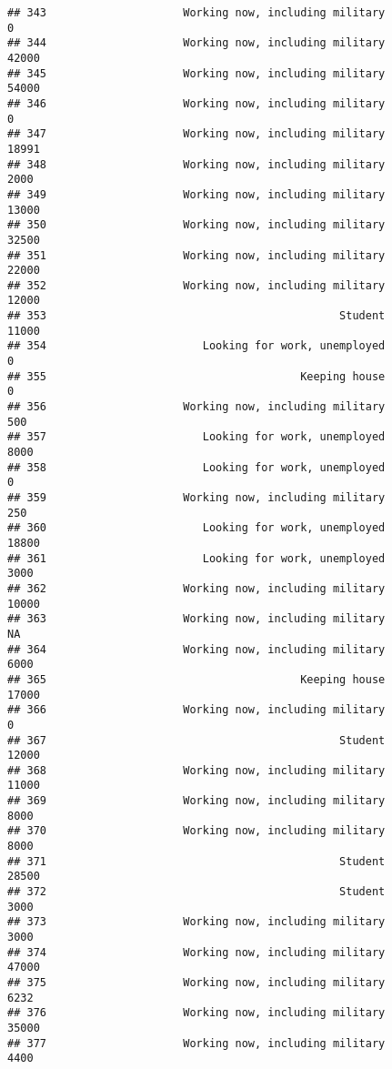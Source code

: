 \documentclass[]{book}
\theoremstyle{definition}
\theoremstyle{definition}
\theoremstyle{remark}
\begin{document}
\begin{verbatim}
## 343                     Working now, including military               0
## 344                     Working now, including military           42000
## 345                     Working now, including military           54000
## 346                     Working now, including military               0
## 347                     Working now, including military           18991
## 348                     Working now, including military            2000
## 349                     Working now, including military           13000
## 350                     Working now, including military           32500
## 351                     Working now, including military           22000
## 352                     Working now, including military           12000
## 353                                             Student           11000
## 354                        Looking for work, unemployed               0
## 355                                       Keeping house               0
## 356                     Working now, including military             500
## 357                        Looking for work, unemployed            8000
## 358                        Looking for work, unemployed               0
## 359                     Working now, including military             250
## 360                        Looking for work, unemployed           18800
## 361                        Looking for work, unemployed            3000
## 362                     Working now, including military           10000
## 363                     Working now, including military              NA
## 364                     Working now, including military            6000
## 365                                       Keeping house           17000
## 366                     Working now, including military               0
## 367                                             Student           12000
## 368                     Working now, including military           11000
## 369                     Working now, including military            8000
## 370                     Working now, including military            8000
## 371                                             Student           28500
## 372                                             Student            3000
## 373                     Working now, including military            3000
## 374                     Working now, including military           47000
## 375                     Working now, including military            6232
## 376                     Working now, including military           35000
## 377                     Working now, including military            4400

\end{verbatim}
\end{document}
